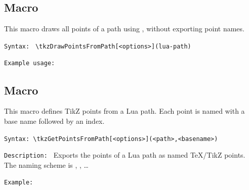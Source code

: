 
\subsection{Macro }
\label{sub:macro_tkzDrawPointsFromPath}

This macro draws all points of a path using , without exporting point names.

\medskip
\texttt{Syntax: }
\verb|\tkzDrawPointsFromPath[<options>](lua-path)|

\medskip
\texttt{Example usage: }

\begin{tkzexample}[latex=.5\textwidth]
\end{tkzexample}



\subsection{Macro }
This macro defines TikZ points from a Lua path. Each point is named with a base name followed by an index.

\texttt{Syntax: }\verb|\tkzGetPointsFromPath[<options>](<path>,<basename>)|

\medskip
\texttt{Description: }
Exports the points of a Lua path as named \TeX/TikZ points.
The naming scheme is , , \dots

\medskip
\texttt{Example: }

\begin{tkzexample}[latex=.5\textwidth]
\end{tkzexample}

